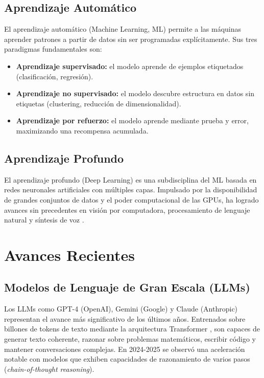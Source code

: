 \documentclass[12pt, a4paper]{article}
\begin{document}
\subsection{Aprendizaje Automático}
El aprendizaje automático (Machine Learning, ML) permite a las máquinas aprender patrones a partir de datos sin ser programadas explícitamente. Sus tres paradigmas fundamentales son:
\begin{itemize}
    \item \textbf{Aprendizaje supervisado:} el modelo aprende de ejemplos etiquetados (clasificación, regresión).
    \item \textbf{Aprendizaje no supervisado:} el modelo descubre estructura en datos sin etiquetas (clustering, reducción de dimensionalidad).
    \item \textbf{Aprendizaje por refuerzo:} el modelo aprende mediante prueba y error, maximizando una recompensa acumulada.
\end{itemize}

\subsection{Aprendizaje Profundo}
El aprendizaje profundo (Deep Learning) es una subdisciplina del ML basada en redes neuronales artificiales con múltiples capas. Impulsado por la disponibilidad de grandes conjuntos de datos y el poder computacional de las GPUs, ha logrado avances sin precedentes en visión por computadora, procesamiento de lenguaje natural y síntesis de voz \cite{lecun2015}.

\section{Avances Recientes}

\subsection{Modelos de Lenguaje de Gran Escala (LLMs)}
Los LLMs como GPT-4 (OpenAI), Gemini (Google) y Claude (Anthropic) representan el avance más significativo de los últimos años. Entrenados sobre billones de tokens de texto mediante la arquitectura Transformer \cite{vaswani2017}, son capaces de generar texto coherente, razonar sobre problemas matemáticos, escribir código y mantener conversaciones complejas. En 2024-2025 se observó una aceleración notable con modelos que exhiben capacidades de razonamiento de varios pasos (\textit{chain-of-thought reasoning}).
\end{document}

